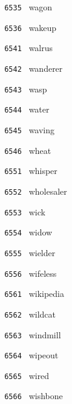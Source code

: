 \documentclass[11pt]{article}
\begin{document}
\begin{multicols}{6}
\noindent \texttt{ 6535 } \hspace{1mm} wagon  \par
\noindent \texttt{ 6536 } \hspace{1mm} wakeup  \par
\noindent \texttt{ 6541 } \hspace{1mm} walrus  \par
\noindent \texttt{ 6542 } \hspace{1mm} wanderer  \par
\noindent \texttt{ 6543 } \hspace{1mm} wasp  \par
\noindent \texttt{ 6544 } \hspace{1mm} water  \par
\noindent \texttt{ 6545 } \hspace{1mm} waving  \par
\noindent \texttt{ 6546 } \hspace{1mm} wheat  \par
\noindent \texttt{ 6551 } \hspace{1mm} whisper  \par
\noindent \texttt{ 6552 } \hspace{1mm} wholesaler  \par
\noindent \texttt{ 6553 } \hspace{1mm} wick  \par
\noindent \texttt{ 6554 } \hspace{1mm} widow  \par
\noindent \texttt{ 6555 } \hspace{1mm} wielder  \par
\noindent \texttt{ 6556 } \hspace{1mm} wifeless  \par
\noindent \texttt{ 6561 } \hspace{1mm} wikipedia  \par
\noindent \texttt{ 6562 } \hspace{1mm} wildcat  \par
\noindent \texttt{ 6563 } \hspace{1mm} windmill  \par
\noindent \texttt{ 6564 } \hspace{1mm} wipeout  \par
\noindent \texttt{ 6565 } \hspace{1mm} wired  \par
\noindent \texttt{ 6566 } \hspace{1mm} wishbone  \par

\end{multicols}
\end{document}
